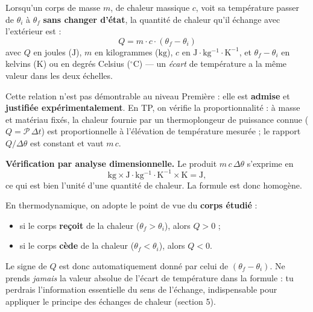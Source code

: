 \documentclass[11pt]{article}
\begin{document}
\begin{propriete}
Lorsqu'un corps de masse $m$, de chaleur massique $c$, voit sa température passer de $\theta_i$ à $\theta_f$ \textbf{sans changer d'état}, la quantité de chaleur qu'il échange avec l'extérieur est :
\[
\boxed{\,Q = m \cdot c \cdot (\theta_f - \theta_i)\,}
\]
avec $Q$ en joules ($\mathrm{J}$), $m$ en kilogrammes ($\mathrm{kg}$), $c$ en $\mathrm{J\cdot kg^{-1}\cdot K^{-1}}$, et $\theta_f - \theta_i$ en kelvins ($\mathrm{K}$) ou en degrés Celsius ($^\circ\mathrm{C}$) — un \emph{écart} de température a la même valeur dans les deux échelles.
\par\smallskip
Cette relation n'est pas démontrable au niveau Première : elle est \textbf{admise} et \textbf{justifiée expérimentalement}. En TP, on vérifie la proportionnalité : à masse et matériau fixés, la chaleur fournie par un thermoplongeur de puissance connue ($Q = \mathcal{P}\,\Delta t$) est proportionnelle à l'élévation de température mesurée ; le rapport $Q/\Delta\theta$ est constant et vaut $m\,c$.
\end{propriete}

\textbf{Vérification par analyse dimensionnelle.} Le produit $m\,c\,\Delta\theta$ s'exprime en
\[
\mathrm{kg} \times \mathrm{J\cdot kg^{-1}\cdot K^{-1}} \times \mathrm{K} = \mathrm{J},
\]
ce qui est bien l'unité d'une quantité de chaleur. La formule est donc homogène.

\begin{attention}
En thermodynamique, on adopte le point de vue du \textbf{corps étudié} :
\begin{itemize}
\item si le corps \textbf{reçoit} de la chaleur ($\theta_f > \theta_i$), alors $Q > 0$ ;
\item si le corps \textbf{cède} de la chaleur ($\theta_f < \theta_i$), alors $Q < 0$.
\end{itemize}
Le signe de $Q$ est donc automatiquement donné par celui de $(\theta_f - \theta_i)$. Ne prends \emph{jamais} la valeur absolue de l'écart de température dans la formule : tu perdrais l'information essentielle du sens de l'échange, indispensable pour appliquer le principe des échanges de chaleur (section 5).
\end{attention}
\end{document}
